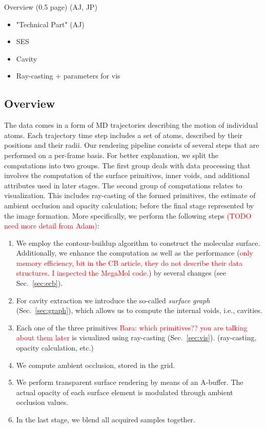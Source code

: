 Overview (0.5 page) (AJ, JP)
\begin{itemize}
  \item "Technical Part" (AJ)
  \item SES
  \item Cavity
  \item Ray-casting + parameters for vis
\end{itemize}

\subsection{Overview}

The data comes in a form of MD trajectories describing the motion of individual atoms. 
Each trajectory time step includes a set of atoms, described by their positions and their radii. 
Our rendering pipeline consists of several steps that are performed on a per-frame basis. 
For better explanation, we split the computations into two groups. 
The first group deals with data processing that involves the computation of the surface primitives, inner voids, and additional attributes used in later stages. The second group of computations relates to visualization. 
This includes ray-casting of the formed primitives, the estimate of ambient occlusion and opacity calculation; before the final stage represented by the image formation. More specifically, we perform the following steps \textcolor{red}{(TODO need more detail from Adam)}:
	\begin{enumerate}
	  \item We employ the contour-buildup algorithm to construct the molecular surface. Additionally, we enhance the computation as well as the performance (\textcolor{red}{only memory efficiency, bit in the CB article, they do not describe their data structures. I inspected the MegaMol code.}) by several changes (see Sec.~\ref{sec:ecb}).
		\item For cavity extraction we introduce the so-called \textit{surface graph} (Sec.~\ref{sec:graph}), which allows us to compute the internal voids, i.e., cavities.
		\item Each one of the three primitives \textcolor{red}{Bara: which primitives?? you are talking about them later} is visualized using ray-casting (Sec.~\ref{sec:vis}). (ray-casting, opacity calculation, etc.)
		\item We compute ambient occlusion, stored in the grid.
		\item We perform transparent surface rendering by means of an A-buffer. The actual opacity of each surface element is modulated through ambient occlusion values.
		\item In the last stage, we blend all acquired samples together.
	\end{enumerate}

